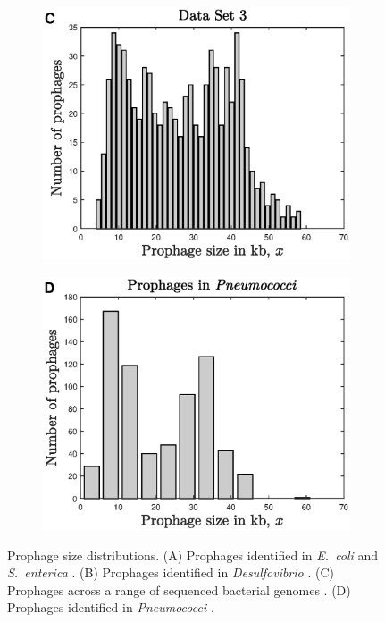 \begin{figure}[H]
    \begin{subfigure}[t]{0.45\textwidth}
    \includegraphics[scale=0.55]{ALCLbar.eps}
    \end{subfigure}\hfill
     \begin{subfigure}[t]{0.45\textwidth} 
    \includegraphics[scale=0.55]{brubar.eps}
     \end{subfigure}\hfill
    \caption[Prophage size distributions.]{ Prophage size distributions.   (A) Prophages identified in \textit{E.~coli} and \textit{S.~enterica} \citep{bobay_pervasive_2014}. (B) Prophages identified in \textit{Desulfovibrio} \citep{crispim_screening_2018}. (C) Prophages across a range of sequenced bacterial genomes \citep{leplae_aclame:_2010}.  (D) Prophages identified in \textit{Pneumococci} \citep{brueggemann_pneumococcal_2017}.}
\label{fig:data}
\end{figure}

